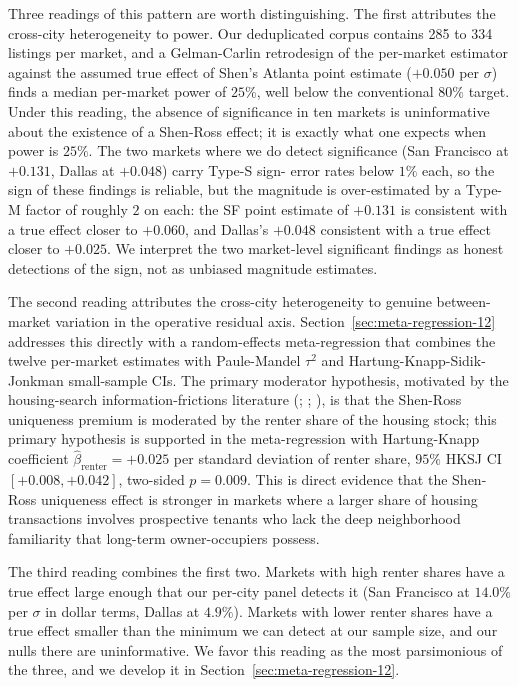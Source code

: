 Three readings of this pattern are worth distinguishing. The first
attributes the cross-city heterogeneity to power.  Our deduplicated
corpus contains 285 to 334 listings per market, and a Gelman-Carlin
\citep{gelman2014beyond} retrodesign of the per-market estimator
against the assumed true effect of Shen's Atlanta point estimate
($+0.050$ per $\sigma$) finds a median per-market power of $25\%$,
well below the conventional $80\%$ target. Under this reading, the
absence of significance in ten markets is uninformative about the
existence of a Shen-Ross effect; it is exactly what one expects when
power is $25\%$. The two markets where we do detect significance
(San Francisco at $+0.131$, Dallas at $+0.048$) carry Type-S sign-
error rates below $1\%$ each, so the sign of these findings is
reliable, but the magnitude is over-estimated by a Type-M factor of
roughly $2$ on each: the SF point estimate of $+0.131$ is consistent
with a true effect closer to $+0.060$, and Dallas's $+0.048$
consistent with a true effect closer to $+0.025$. We interpret the
two market-level significant findings as honest detections of the
sign, not as unbiased magnitude estimates.

The second reading attributes the cross-city heterogeneity to
genuine between-market variation in the operative residual axis.
Section~\ref{sec:meta-regression-12} addresses this directly with a
random-effects meta-regression that combines the twelve per-market
estimates with Paule-Mandel $\tau^2$ and Hartung-Knapp-Sidik-Jonkman
small-sample CIs.  The primary moderator hypothesis, motivated by
the housing-search information-frictions literature
(\citealt{stigler1961economics};
\citealt{genesove1997equity}; \citealt{anenberg2020housing}), is
that the Shen-Ross uniqueness premium is moderated by the renter
share of the housing stock; this primary hypothesis is supported in
the meta-regression with Hartung-Knapp coefficient
$\hat\beta_{\mathrm{renter}} = +0.025$ per standard deviation of
renter share, $95\%$ HKSJ CI $[+0.008, +0.042]$, two-sided
$p = 0.009$. This is direct evidence that the Shen-Ross uniqueness
effect is stronger in markets where a larger share of housing
transactions involves prospective tenants who lack the deep
neighborhood familiarity that long-term owner-occupiers possess.

The third reading combines the first two. Markets with high renter
shares have a true effect large enough that our per-city panel
detects it (San Francisco at $14.0\%$ per $\sigma$ in dollar terms,
Dallas at $4.9\%$). Markets with lower renter shares have a true
effect smaller than the minimum we can detect at our sample size, and
our nulls there are uninformative. We favor this reading as the most
parsimonious of the three, and we develop it in
Section~\ref{sec:meta-regression-12}.

